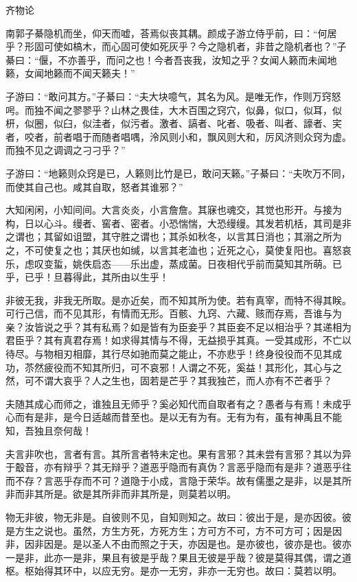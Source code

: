 \documentclass[]{article}
\begin{document}
齐物论

南郭子綦隐机而坐，仰天而嘘，荅焉似丧其耦。颜成子游立侍乎前，曰：``何居乎？形固可使如槁木，而心固可使如死灰乎？今之隐机者，非昔之隐机者也？''子綦曰：``偃，不亦善乎，而问之也！今者吾丧我，汝知之乎？女闻人籁而未闻地籁，女闻地籁而不闻天籁夫！''

子游曰：``敢问其方。''子綦曰：``夫大块噫气，其名为风。是唯无作，作则万窍怒呺。而独不闻之翏翏乎？山林之畏佳，大木百围之窍穴，似鼻，似口，似耳，似枅，似圈，似臼，似洼者，似污者。激者、謞者、叱者、吸者、叫者、譹者、宎者，咬者，前者唱于而随者唱喁，泠风则小和，飘风则大和，厉风济则众窍为虚。而独不见之调调之刁刁乎？''

子游曰：``地籁则众窍是已，人籁则比竹是已，敢问天籁。''子綦曰：``夫吹万不同，而使其自己也。咸其自取，怒者其谁邪？''

大知闲闲，小知间间。大言炎炎，小言詹詹。其寐也魂交，其觉也形开。与接为构，日以心斗。缦者、窖者、密者。小恐惴惴，大恐缦缦。其发若机栝，其司是非之谓也；其留如诅盟，其守胜之谓也；其杀如秋冬，以言其日消也；其溺之所为之，不可使复之也；其厌也如缄，以言其老洫也；近死之心，莫使复阳也。喜怒哀乐，虑叹变蜇，姚佚启态------乐出虚，蒸成菌。日夜相代乎前而莫知其所萌。已乎，已乎！旦暮得此，其所由以生乎！

非彼无我，非我无所取。是亦近矣，而不知其所为使。若有真宰，而特不得其眹。可行己信，而不见其形，有情而无形。百骸、九窍、六藏、赅而存焉，吾谁与为亲？汝皆说之乎？其有私焉？如是皆有为臣妾乎？其臣妾不足以相治乎？其递相为君臣乎？其有真君存焉！如求得其情与不得，无益损乎其真。一受其成形，不亡以待尽。与物相刃相靡，其行尽如驰而莫之能止，不亦悲乎！终身役役而不见其成功，苶然疲役而不知其所归，可不哀邪！人谓之不死，奚益！其形化，其心与之然，可不谓大哀乎？人之生也，固若是芒乎？其我独芒，而人亦有不芒者乎？

夫随其成心而师之，谁独且无师乎？奚必知代而自取者有之？愚者与有焉！未成乎心而有是非，是今日适越而昔至也。是以无有为有。无有为有，虽有神禹且不能知，吾独且奈何哉！

夫言非吹也，言者有言。其所言者特未定也。果有言邪？其未尝有言邪？其以为异于鷇音，亦有辩乎？其无辩乎？道恶乎隐而有真伪？言恶乎隐而有是非？道恶乎往而不存？言恶乎存而不可？道隐于小成，言隐于荣华。故有儒墨之是非，以是其所非而非其所是。欲是其所非而非其所是，则莫若以明。

物无非彼，物无非是。自彼则不见，自知则知之。故曰：彼出于是，是亦因彼。彼是方生之说也。虽然，方生方死，方死方生；方可方不可，方不可方可；因是因非，因非因是。是以圣人不由而照之于天，亦因是也。是亦彼也，彼亦是也。彼亦一是非，此亦一是非，果且有彼是乎哉？果且无彼是乎哉？彼是莫得其偶，谓之道枢。枢始得其环中，以应无穷。是亦一无穷，非亦一无穷也。故曰：莫若以明。
\end{document}
